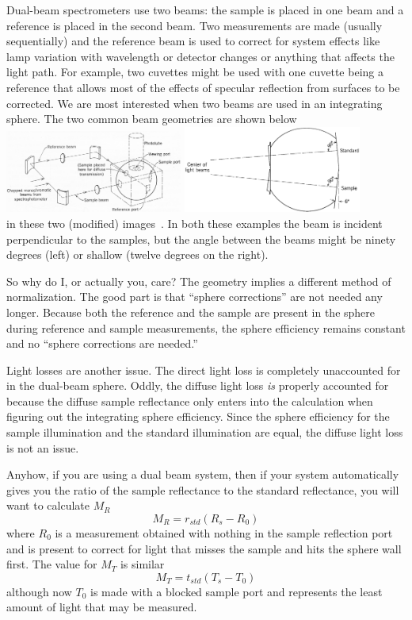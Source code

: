 \documentclass{article}
\begin{document}
Dual-beam spectrometers use two beams:  the sample is placed in one beam
and a reference is placed in the second beam.  Two measurements are made (usually
sequentially) and the reference beam is used to correct for system effects like
lamp variation with wavelength or detector changes or anything that affects the 
light path.  For example, two cuvettes might be used with one cuvette being a
reference that allows most of the effects of specular reflection from surfaces to
be corrected.
We are most interested when two beams are used in an integrating sphere.  
The two common beam geometries are shown below
\\
\includegraphics[width=2.3in]{dual90.png}
\includegraphics[width=2.3in]{dual8.png}\\
in these two (modified) images~\cite{wendlandt66}.  In both these examples
the beam is incident perpendicular to the samples, but the angle between
the beams might be ninety degrees (left) or shallow (twelve degrees on the right).

So why do I, or actually you, care?  The geometry implies a different method
of normalization.  The good part is that ``sphere corrections'' are not needed
any longer.  Because both the reference and the sample are present in the sphere
during reference and sample measurements, the sphere efficiency remains constant
and no ``sphere corrections are needed.''  

Light losses are another issue.  The direct light loss is completely unaccounted
for in the dual-beam sphere.  Oddly, the diffuse light loss \textit{is} properly
accounted for because the diffuse sample reflectance only enters into the calculation
when figuring out the integrating sphere efficiency.  Since the sphere efficiency
for the sample illumination and the standard illumination are equal, the diffuse
light loss is not an issue.

Anyhow, if you are using a dual beam system, then if your system automatically
gives you the ratio of the sample reflectance to the standard reflectance, you
will want to calculate $M_R$ 
$$
M_R = r_{\mathit{std}} (R_s - R_0)
$$
where $R_0$ is a measurement obtained with nothing in the sample reflection port and is present
to correct for light that misses the sample and hits the
sphere wall first.  The value for  $M_T$ is similar
$$
M_T = t_{\mathit{std}} (T_s - T_0)
$$
although now $T_0$ is made with a blocked sample port and represents the least amount
of light that may be measured.
\end{document}
